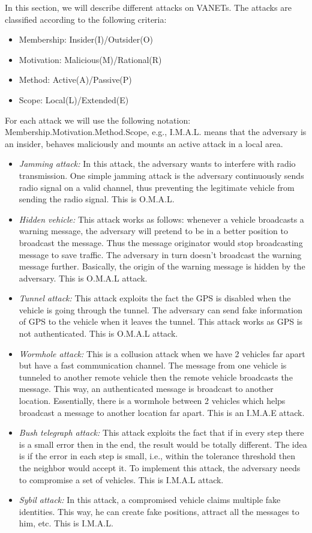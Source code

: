 \documentclass{IEEEtran}
\begin{document}
In this section, we will describe different attacks on VANETs. The attacks are classified according to the following criteria:
\begin{itemize}
\item Membership: Insider(I)/Outsider(O)
\item Motivation: Malicious(M)/Rational(R)
\item Method: Active(A)/Passive(P)
\item Scope: Local(L)/Extended(E)
\end{itemize}
For each attack we will use the following notation: Membership.Motivation.Method.Scope, e.g., I.M.A.L. means that the adversary is an insider, behaves maliciously and mounts an active attack in a local area.

\begin{itemize}
\item \emph{Jamming attack:} In this attack, the adversary wants to interfere with radio transmission. One simple jamming attack is the adversary continuously sends radio signal on a valid channel, thus preventing the legitimate vehicle from sending the radio signal. This is O.M.A.L.
\item \emph{Hidden vehicle:} This attack works as follows: whenever a vehicle broadcasts a warning message, the adversary will pretend to be in a better position to broadcast the message. Thus the message originator would stop broadcasting message to save traffic. The adversary in turn doesn’t broadcast the warning message further. Basically, the origin of the warning message is hidden by the adversary. This is O.M.A.L attack.
\item \emph{Tunnel attack:} This attack exploits the fact the GPS is disabled when the vehicle is going through the tunnel. The adversary can send fake information of GPS to the vehicle when it leaves the tunnel. This attack works as GPS is not authenticated. This is O.M.A.L attack.
\item \emph{Wormhole attack:} This is a collusion attack when we have 2 vehicles far apart but have a fast communication channel. The message from one vehicle is tunneled to another remote vehicle then the remote vehicle broadcasts the message. This way, an authenticated message is broadcast to another location. Essentially, there is a wormhole between 2 vehicles which helps broadcast a message to another location far apart. This is an I.M.A.E attack.
\item \emph{Bush telegraph attack:} This attack exploits the fact that if in every step there is a small error then in the end, the result would be totally different. The idea is if the error in each step is small, i.e., within the tolerance threshold then the neighbor would accept it. To implement this attack, the adversary needs to compromise a set of vehicles. This is I.M.A.L attack.
\item \emph{Sybil attack:} In this attack, a compromised vehicle claims multiple fake identities. This way, he can create fake positions, attract all the messages to him, etc. This is I.M.A.L.
\end{itemize}
\end{document}
